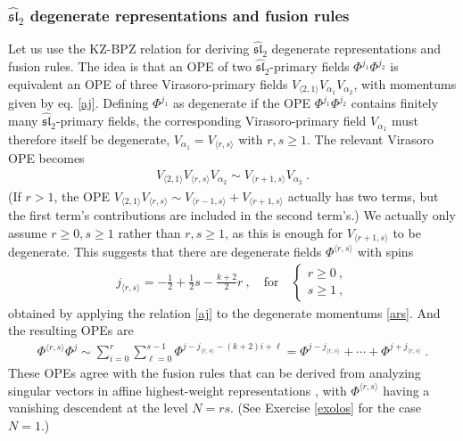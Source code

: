 \documentclass[12pt, a4paper, notitlepage, twoside]{report}
\numberwithin{equation}{section}
\theoremstyle{break}
\begin{document}
\subsubsection{\texorpdfstring{$\widehat{\mathfrak{sl}}_2$}{sl2} degenerate representations and fusion rules}

Let us use the KZ-BPZ relation for deriving $\widehat{\mathfrak{sl}}_2$ degenerate representations and fusion rules. 
The idea is that an OPE of two $\widehat{\mathfrak{sl}}_2$-primary fields $\Phi^{j_1}\Phi^{j_2}$ is equivalent an OPE of three Virasoro-primary fields $V_{\langle 2, 1\rangle}V_{\alpha_1}V_{\alpha_2}$, with momentums given by eq. \eqref{aj}.
Defining $\Phi^{j_1}$ as degenerate if the OPE $\Phi^{j_1}\Phi^{j_2}$ contains finitely many $\widehat{\mathfrak{sl}}_2$-primary fields, the corresponding Virasoro-primary field $V_{\alpha_1}$ must therefore itself be degenerate, $V_{\alpha_1}=V_{\langle r, s\rangle}$ with $r,s\geq 1$. 
The relevant Virasoro OPE becomes 
\begin{align}
 V_{\langle 2, 1\rangle}V_{\langle r, s\rangle}V_{\alpha_2} \sim V_{\langle r+1, s\rangle}V_{\alpha_2}\ .
\end{align}
(If $r>1$, the OPE $V_{\langle 2, 1\rangle}V_{\langle r, s\rangle}\sim V_{\langle r-1, s\rangle}+ V_{\langle r+1, s\rangle}$ actually has two terms, but the first term's contributions are included in the second term's.)
We actually only assume $r\geq 0,s\geq 1$ rather than $r,s\geq 1$, as this is enough for $V_{\langle r+1, s\rangle}$ to be degenerate.
This suggests that there are degenerate fields $\Phi^{\langle r,s\rangle}$ with spins
\begin{align}
 j_{\langle r,s\rangle} = -\frac12 +\frac12 s -\frac{k+2}{2} r \ , \quad \text{for} \quad \left\{\begin{array}{l} r\geq 0\ , \\ s\geq 1\ , \end{array}\right.
 \label{jrs}
\end{align}
obtained by applying the relation \eqref{aj} to the degenerate momentums \eqref{ars}. And the resulting OPEs are
\begin{align}
 \Phi^{\langle r, s\rangle}\Phi^j \sim 
 \sum_{i=0}^r \sum_{\ell=0}^{s-1} \Phi^{j-j_{\langle r,s\rangle}-(k+2)i+\ell}
 = \Phi^{j-j_{\langle r,s\rangle}} + \cdots + \Phi^{j+j_{\langle r,s\rangle}}\ .
 \label{prspj}
\end{align}
These OPEs agree with the fusion rules that can be derived from analyzing singular vectors in affine highest-weight representations \cite{ay92}, with $\Phi^{\langle r, s\rangle}$ having a vanishing descendent at the level $N=rs$. (See Exercise \ref{exolos} for the case $N=1$.) 
\end{document}
